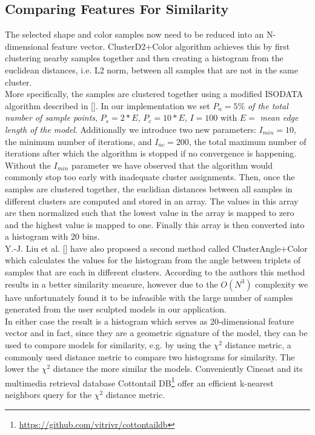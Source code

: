\subsection{Comparing Features For Similarity}

The selected shape and color samples now need to be reduced into an N-dimensional feature vector. ClusterD2+Color algorithm achieves this by first clustering nearby samples together and then
creating a histogram from the euclidean distances, i.e. L2 norm, between all samples that are not in the same cluster.\\
More specifically, the samples are clustered together using a modified
ISODATA algorithm described in []. In our implementation we set $P_n = 5\%$ \textit{of the total number of sample points}, $P_s = 2 * E$, $P_c = 10 * E$, $I = 100$ with $E =$ \textit{mean edge length of the model}.
Additionally we introduce two new parameters: $I_{min} = 10$, the minimum number of iterations, and $I_{nc} = 200$, the total maximum number of iterations after which the algorithm is stopped if no convergence is happening. Without
the $I_{min}$ parameter we have observed that the algorithm would commonly stop too early with inadequate cluster assignments. Then, once the samples are clustered together, the euclidian distances between all samples in different clusters
are computed and stored in an array. The values in this array are then normalized such that the lowest value in the array is mapped to zero and the highest value is mapped to one. Finally this array is then converted into a histogram with $20$ bins.\\
Y.-J. Liu et al. [] have also proposed a second method called ClusterAngle+Color which calculates the values for the histogram from the angle between triplets of samples that are each in different clusters. According
to the authors this method results in a better similarity measure, however due to the $O(N^3)$ complexity we have unfortunately found it to be infeasible with the large number of samples generated from the user sculpted models in our application.\\
In either case the result is a histogram which serves as 20-dimensional feature vector and in fact, since they are a geometric signature of the model, they can be used to compare models for similarity,
e.g. by using the $\chi^2$ distance metric, a commonly used distance metric to compare two histograms for similarity. The lower the $\chi^2$ distance the more similar the models. Conveniently Cineast and its multimedia retrieval
database Cottontail DB\footnote{\url{https://github.com/vitrivr/cottontaildb}} offer an efficient k-nearest neighbors query for the $\chi^2$ distance metric.\\

